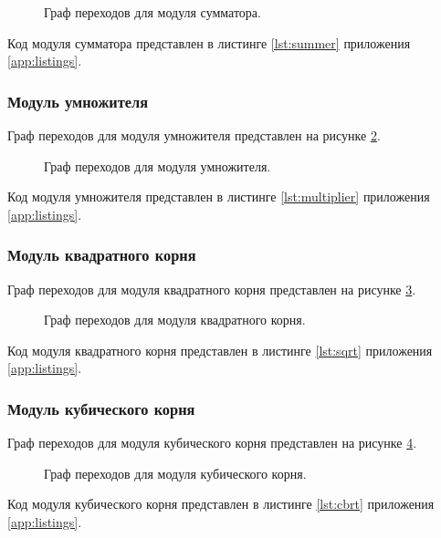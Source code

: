 \begin{figure}[h]
    \caption{Граф переходов для модуля сумматора.}
    \label{fig:adder_fsm}
    \centering
\end{figure}

Код модуля сумматора представлен в листинге \ref{lst:summer} приложения \ref{app:listings}.

\subsubsection{Модуль умножителя}

Граф переходов для модуля умножителя представлен на рисунке \ref{fig:multiplier_fsm}.

\begin{figure}[h]
    \caption{Граф переходов для модуля умножителя.}
    \label{fig:multiplier_fsm}
    \centering
\end{figure}

Код модуля умножителя представлен в листинге \ref{lst:multiplier} приложения \ref{app:listings}.

\subsubsection{Модуль квадратного корня}

Граф переходов для модуля квадратного корня представлен на рисунке \ref{fig:sqrt_fsm}.

\begin{figure}[h]
    \caption{Граф переходов для модуля квадратного корня.}
    \label{fig:sqrt_fsm}
    \centering
\end{figure}

Код модуля квадратного корня представлен в листинге \ref{lst:sqrt} приложения \ref{app:listings}.

\subsubsection{Модуль кубического корня}

Граф переходов для модуля кубического корня представлен на рисунке \ref{fig:cbrt_fsm}.

\begin{figure}[h]
    \caption{Граф переходов для модуля кубического корня.}
    \label{fig:cbrt_fsm}
    \centering
\end{figure}

Код модуля кубического корня представлен в листинге \ref{lst:cbrt} приложения \ref{app:listings}.